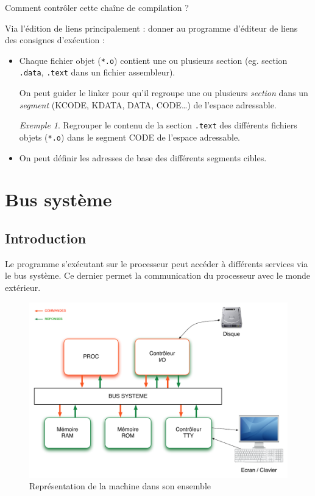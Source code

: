 \documentclass[11pt,english,french]{scrreprt}
\theoremstyle{remark}
\newtheorem*{ex*}{Exemple}
\theoremstyle{definition}
\begin{document}
Comment contrôler cette chaîne de compilation ?

Via l'édition de liens principalement : donner au programme d'éditeur de liens des consignes d'exécution :\begin{itemize}
	\item Chaque fichier objet (\lstinline!*.o!) contient une ou plusieurs section (eg. section \lstinline!.data!, \lstinline!.text! dans un fichier assembleur).
	
	On peut guider le linker pour qu'il regroupe une ou plusieurs \emph{section} dans un \emph{segment} (KCODE, KDATA, DATA, CODE\dots) de l'espace adressable.
	
	\begin{ex*}
		Regrouper le contenu de la section \lstinline!.text! des différents fichiers objets (\lstinline!*.o!) dans le segment CODE de l'espace adressable.
	\end{ex*}
	\item On peut définir les adresses de base des différents segments cibles.
\end{itemize} 

\chapter{Bus système} %

\section{Introduction} %

Le programme s'exécutant sur le processeur peut accéder à différents services via le bus système. Ce dernier permet la communication du processeur avec le monde extérieur.

\begin{figure}[!h]
	\center
	\includegraphics[scale=.75]{diagrammes/Bus1}
	\caption{Représentation de la machine dans son ensemble}
\end{figure}
\end{document}
